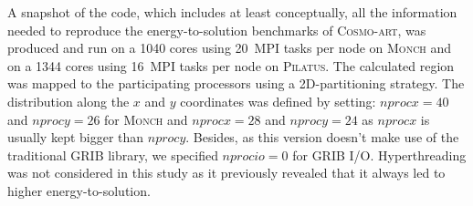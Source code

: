 A snapshot of the code,  which includes at least conceptually, all the
information needed  to reproduce the  energy-to-solution benchmarks of
\textsc{Cosmo-art}, was produced and run  on a 1040 cores using 20~MPI
tasks  per node on  \textsc{Monch} and  on a  1344 cores  using 16~MPI
tasks per node on  \textsc{Pilatus}.  The calculated region was mapped
to the participating processors using a 2D-partitioning strategy.  The
distribution along the $x$ and $y$ coordinates was defined by setting:
$nprocx=40$  and $nprocy=26$  for \textsc{Monch}  and  $nprocx=28$ and
$nprocy=24$  as  $nprocx$  is   usually  kept  bigger  than  $nprocy$.
Besides,  as this  version doesn't  make use  of the  traditional GRIB
library, we  specified $nprocio=0$  for GRIB I/O.   Hyperthreading was
not considered in this study  as it previously revealed that it always
led to higher energy-to-solution.



